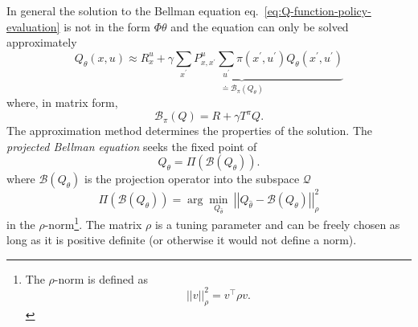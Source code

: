 In general the solution to the Bellman equation eq.~\eqref{eq:Q-function-policy-evaluation} is not in the form $\Phi\theta$ and the equation can only be solved approximately
\begin{equation*}
  Q_\theta(x,u) \approx \underbrace{R_x^u + \gamma\sum_{x^\prime} P_{x,x^\prime}^u \sum_{u^\prime} \pi(x^\prime,u^\prime)Q_\theta(x^\prime,u^\prime)}_{\doteq\mathcal{B}_\pi(Q_\theta)}
\end{equation*}
where, in matrix form,
\begin{equation}
  \label{eq:Q-function-matrix}
  \mathcal{B}_\pi(Q) = R + \gamma T^\pi Q.
\end{equation}
The approximation method determines the properties of the solution. The \emph{projected Bellman equation} seeks the fixed point of
\begin{equation}
  \label{eq:projected-Bellman-equation}
  Q_\theta = \Pi(\mathcal{B}(Q_\theta)).
\end{equation}
where $\mathcal{B}(Q_\theta)$ is the projection operator into the subspace $\mathcal{Q}$
\begin{equation*}
  \Pi(\mathcal{B}(Q_\theta)) = \arg \min_{Q_{\hat{\theta}}}\ \left|\!\left| Q_{\hat{\theta}} - \mathcal{B}(Q_\theta) \right|\!\right|_\rho^2
\end{equation*}
in the $\rho$-norm\footnote{The $\rho$-norm is defined as
\begin{equation*}
  |\!|v|\!|_\rho^2 = v^\top \rho v.
\end{equation*}}. The matrix $\rho$ is a tuning parameter and can be freely chosen as long as it is positive definite (or otherwise it would not define a norm).

